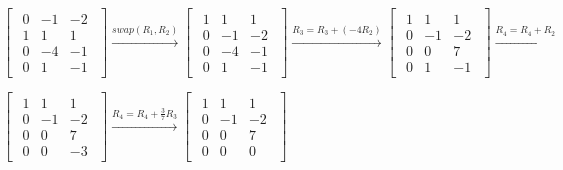 \singlespacing

\begin{math}
    \begin{bmatrix}
        \begin{array}{ccc}
            0 & -1 & -2 \\
            1 & 1  & 1  \\
            0 & -4 & -1 \\
            0 & 1  & -1
        \end{array}
    \end{bmatrix} \xrightarrow{swap(R_1,R_2)}
    \begin{bmatrix}
        \begin{array}{ccc}
            1 & 1  & 1  \\
            0 & -1 & -2 \\
            0 & -4 & -1 \\
            0 & 1  & -1
        \end{array}
    \end{bmatrix}\xrightarrow{R_3 = R_3 + (-4R_2)}
    \begin{bmatrix}
        \begin{array}{ccc}
            1 & 1  & 1  \\
            0 & -1 & -2 \\
            0 & 0  & 7  \\
            0 & 1  & -1
        \end{array}
    \end{bmatrix}\xrightarrow{R_4 = R_4 + R_2}
\end{math}

\singlespacing

\begin{math}
    \begin{bmatrix}
        \begin{array}{ccc}
            1 & 1  & 1  \\
            0 & -1 & -2 \\
            0 & 0  & 7  \\
            0 & 0  & -3
        \end{array}
    \end{bmatrix} \xrightarrow{R_4 = R_4 + \frac{3}{7}R_3}
    \begin{bmatrix}
        \begin{array}{ccc}
            1 & 1  & 1  \\
            0 & -1 & -2 \\
            0 & 0  & 7  \\
            0 & 0  & 0
        \end{array}
    \end{bmatrix}
\end{math}

